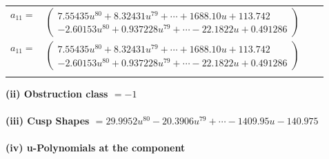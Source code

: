 \documentclass[1p]{elsarticle_modified}
\theoremstyle{definition}
\begin{document}
\begin{tabular}{m{7pt} m{180pt} m{7pt} m{180pt} }
\flushright $a_{11}=$&$\begin{pmatrix}7.55435 u^{80}+8.32431 u^{79}+\cdots+1688.10 u+113.742\\-2.60153 u^{80}+0.937228 u^{79}+\cdots-22.1822 u+0.491286\end{pmatrix}$\\ \flushright $a_{11}=$&$\begin{pmatrix}7.55435 u^{80}+8.32431 u^{79}+\cdots+1688.10 u+113.742\\-2.60153 u^{80}+0.937228 u^{79}+\cdots-22.1822 u+0.491286\end{pmatrix}$\\&\end{tabular}
\flushleft \textbf{(ii) Obstruction class $= -1$}\\~\\
\flushleft \textbf{(iii) Cusp Shapes $= 29.9952 u^{80}-20.3906 u^{79}+\cdots-1409.95 u-140.975$}\\~\\
\newpage\renewcommand{\arraystretch}{1}
\flushleft \textbf{(iv) u-Polynomials at the component}\newline \\
\end{document}
